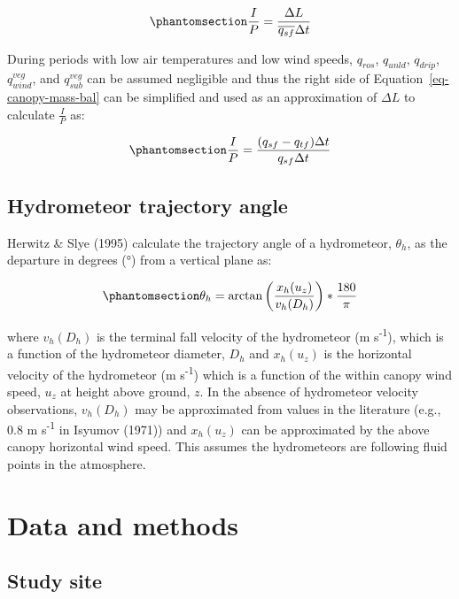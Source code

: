 \documentclass[
  letterpaper,
  DIV=11,
  numbers=noendperiod]{scrartcl}
\begin{document}
\begin{equation}\phantomsection\label{eq-ip}{
\frac{I}{P} = \frac{\Delta L}{\overline{q_{sf}} \Delta t}
}\end{equation}

During periods with low air temperatures and low wind speeds,
\(q_{ros}\), \(q_{unld}\), \(q_{drip}\), \(q_{wind}^{veg}\), and
\(q_{sub}^{veg}\) can be assumed negligible and thus the right side of
Equation~\ref{eq-canopy-mass-bal} can be simplified and used as an
approximation of \(\Delta L\) to calculate \(\frac{I}{P}\) as:

\begin{equation}\phantomsection\label{eq-ip2}{
\frac{I}{P} = \frac{(q_{sf} - q_{tf})\Delta t}{q_{sf} \Delta t}
}\end{equation}

\subsection{Hydrometeor trajectory
angle}\label{hydrometeor-trajectory-angle}

Herwitz \& Slye (1995) calculate the trajectory angle of a hydrometeor,
\(\theta_h\), as the departure in degrees (°) from a vertical plane as:

\begin{equation}\phantomsection\label{eq-ta}{
\theta_h = \arctan \left(\frac{x_h(u_z)}{v_h(D_h)}\right)*\frac{180}{\pi}
}\end{equation}

where \(v_h(D_h)\) is the terminal fall velocity of the hydrometeor (m
s\textsuperscript{-1}), which is a function of the hydrometeor diameter,
\(D_h\) and \(x_h(u_z)\) is the horizontal velocity of the hydrometeor
(m s\textsuperscript{-1}) which is a function of the within canopy wind
speed, \(u_z\) at height above ground, \(z\). In the absence of
hydrometeor velocity observations, \(v_h(D_h)\) may be approximated from
values in the literature (e.g., 0.8 m s\textsuperscript{-1} in Isyumov
(1971)) and \(x_h(u_z)\) can be approximated by the above canopy
horizontal wind speed. This assumes the hydrometeors are following fluid
points in the atmosphere.

\section{Data and methods}\label{data-and-methods}

\subsection{Study site}\label{study-site}
\end{document}
